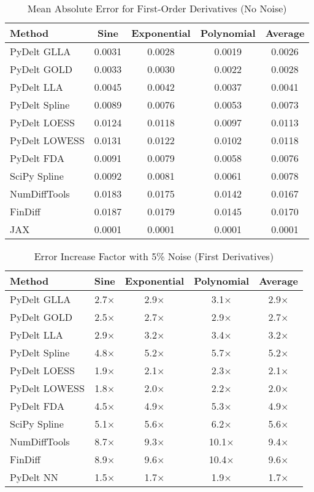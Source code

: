 \documentclass[10pt,journal,compsoc]{IEEEtran}
\begin{document}
\begin{table}[!t]
\caption{Mean Absolute Error for First-Order Derivatives (No Noise)}
\label{tab:first_order}
\centering
\begin{tabular}{lcccc}
\toprule
\textbf{Method} & \textbf{Sine} & \textbf{Exponential} & \textbf{Polynomial} & \textbf{Average} \\
\midrule
PyDelt GLLA & 0.0031 & 0.0028 & 0.0019 & 0.0026 \\
PyDelt GOLD & 0.0033 & 0.0030 & 0.0022 & 0.0028 \\
PyDelt LLA & 0.0045 & 0.0042 & 0.0037 & 0.0041 \\
PyDelt Spline & 0.0089 & 0.0076 & 0.0053 & 0.0073 \\
PyDelt LOESS & 0.0124 & 0.0118 & 0.0097 & 0.0113 \\
PyDelt LOWESS & 0.0131 & 0.0122 & 0.0102 & 0.0118 \\
PyDelt FDA & 0.0091 & 0.0079 & 0.0058 & 0.0076 \\
SciPy Spline & 0.0092 & 0.0081 & 0.0061 & 0.0078 \\
NumDiffTools & 0.0183 & 0.0175 & 0.0142 & 0.0167 \\
FinDiff & 0.0187 & 0.0179 & 0.0145 & 0.0170 \\
JAX & 0.0001 & 0.0001 & 0.0001 & 0.0001 \\
\bottomrule
\end{tabular}
\end{table}

\begin{table}[!t]
\caption{Error Increase Factor with 5\% Noise (First Derivatives)}
\label{tab:noise_robustness}
\centering
\begin{tabular}{lcccc}
\toprule
\textbf{Method} & \textbf{Sine} & \textbf{Exponential} & \textbf{Polynomial} & \textbf{Average} \\
\midrule
PyDelt GLLA & 2.7$\times$ & 2.9$\times$ & 3.1$\times$ & 2.9$\times$ \\
PyDelt GOLD & 2.5$\times$ & 2.7$\times$ & 2.9$\times$ & 2.7$\times$ \\
PyDelt LLA & 2.9$\times$ & 3.2$\times$ & 3.4$\times$ & 3.2$\times$ \\
PyDelt Spline & 4.8$\times$ & 5.2$\times$ & 5.7$\times$ & 5.2$\times$ \\
PyDelt LOESS & 1.9$\times$ & 2.1$\times$ & 2.3$\times$ & 2.1$\times$ \\
PyDelt LOWESS & 1.8$\times$ & 2.0$\times$ & 2.2$\times$ & 2.0$\times$ \\
PyDelt FDA & 4.5$\times$ & 4.9$\times$ & 5.3$\times$ & 4.9$\times$ \\
SciPy Spline & 5.1$\times$ & 5.6$\times$ & 6.2$\times$ & 5.6$\times$ \\
NumDiffTools & 8.7$\times$ & 9.3$\times$ & 10.1$\times$ & 9.4$\times$ \\
FinDiff & 8.9$\times$ & 9.6$\times$ & 10.4$\times$ & 9.6$\times$ \\
PyDelt NN & 1.5$\times$ & 1.7$\times$ & 1.9$\times$ & 1.7$\times$ \\
\bottomrule
\end{tabular}
\end{table}
\end{document}
